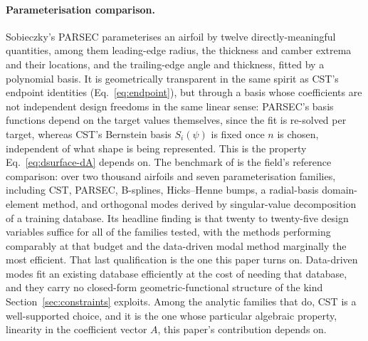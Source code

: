 \paragraph{Parameterisation comparison.} Sobieczky's PARSEC
\citep{sobieczky1999parsec} parameterises an airfoil by twelve
directly-meaningful quantities, among them leading-edge radius, the thickness
and camber extrema and their locations, and the trailing-edge angle and
thickness, fitted by a polynomial basis. It is geometrically transparent in
the same spirit as CST's endpoint identities (Eq.~\eqref{eq:endpoint}), but
through a basis whose coefficients are not independent design freedoms in the
same linear sense: PARSEC's basis functions depend on the target values
themselves, since the fit is re-solved per target, whereas CST's Bernstein
basis $S_i(\psi)$ is fixed once $n$ is chosen, independent of what shape is
being represented. This is the property Eq.~\eqref{eq:dsurface-dA} depends on.
The benchmark of \citet{masters2017geometric} is the field's reference
comparison: over two thousand airfoils and seven parameterisation families,
including CST, PARSEC, B-splines, Hicks--Henne bumps, a radial-basis
domain-element method, and orthogonal modes derived by singular-value
decomposition of a training database. Its headline finding is that twenty to
twenty-five design variables suffice for all of the families tested, with the
methods performing comparably at that budget and the data-driven modal method
marginally the most efficient. That last qualification is the one this paper
turns on. Data-driven modes fit an existing database efficiently at the cost
of needing that database, and they carry no closed-form geometric-functional
structure of the kind Section~\ref{sec:constraints} exploits. Among the
analytic families that do, CST is a well-supported choice, and it is the one
whose particular algebraic property, linearity in the coefficient vector $A$,
this paper's contribution depends on.

